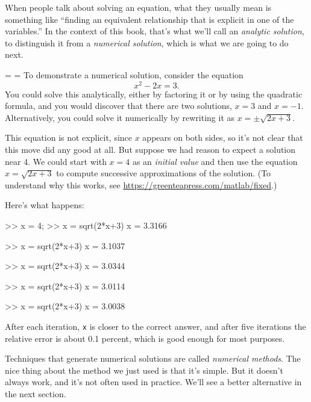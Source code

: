 When people talk about solving an equation, what they usually mean
is something like ``finding an equivalent relationship that is
explicit in one of the variables.''  In the context of this book,
that's what we'll call an \emph{analytic \mbox{solution}}, to distinguish
it from a \emph{numerical solution}, which is what we are going to
do next.


{\binoppenalty=\maxdimen%
\relpenalty=\maxdimen%
To demonstrate a numerical solution, consider the equation 
\begin{equation} \label{e:fzero}
x^2 - 2x = 3.
\end{equation}  
You could solve this analytically, either by factoring it or by
using the quad\-ratic formula, and you would discover that there are
two solutions, $x=3$ and $x=-1$.  Alternatively, you could solve it
numerically by rewriting it as $x = \pm \sqrt{2x+3}$.}

This equation is not explicit, since $x$ appears on both sides, so
it's not clear that this move did any good at all.  But suppose we had
reason to expect a solution near 4.
We could start with $x=4$ as an \emph{initial value} and then use
the equation $x = \sqrt{2x+3}$ to compute successive
approximations of the solution. (To understand why this
works, see \url{https://greenteapress.com/matlab/fixed}.)


Here's what happens:

\begin{code}
>> x = 4;
>> x = sqrt(2*x+3)
x = 3.3166

>> x = sqrt(2*x+3)
x = 3.1037

>> x = sqrt(2*x+3)
x = 3.0344

>> x = sqrt(2*x+3)
x = 3.0114

>> x = sqrt(2*x+3)
x = 3.0038
\end{code}

After each iteration, \lstinline{x} is closer to the correct answer,
and after five iterations the relative error is about 0.1 percent, which
is good enough for most purposes.


Techniques that generate numerical solutions are called
\emph{numerical \mbox{methods}}.
The nice thing about the method we just used is that it's simple.  But it doesn't always
work, and it's not often used in practice.
We'll see a better alternative in the next section.

